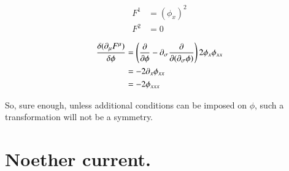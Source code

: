\documentclass{article}
\begin{document}
\begin{align*}
F^1 &= (\phi_x)^2 \\
F^2 &= 0
\end{align*}

\begin{align*}
\frac{\delta (\partial_\mu F^\mu)}{\delta \phi} 
&=
\left(\frac{\partial {}}{\partial {\phi}} - \partial_\sigma \frac{\partial {}}{\partial {(\partial_\sigma \phi)}}\right) 2 \phi_x \phi_{xx} \\
&=
- 2 \partial_x \phi_{xx} \\
&=
- 2 \phi_{xxx} \\
\end{align*}

So, sure enough, unless additional conditions can be imposed on $\phi$, such a transformation
will not be a symmetry.

\section{ Noether current. }



\end{document}
